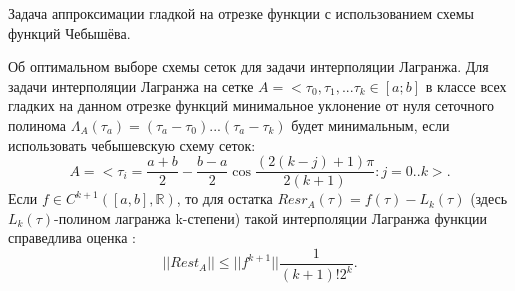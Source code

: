 \documentclass[__main__.tex]{subfiles}
\begin{document}
Задача аппроксимации гладкой на отрезке функции с использованием схемы функций Чебышёва.\\

\begin{theorem}
	Об оптимальном выборе схемы сеток для задачи интерполяции Лагранжа. Для задачи интерполяции Лагранжа на сетке $A=<\tau_{0},\tau_{1},...\tau_{k}\in[a;b]$ в классе всех гладких на данном отрезке функций минимальное уклонение от нуля сеточного полинома $\Lambda_{A}(\tau_{a})=(\tau_{a}-\tau_{0})...(\tau_{a}-\tau_{k})$ будет минимальным, если использовать чебышевскую схему сеток:
	$$A=<\tau_{i}=\frac{a+b}{2}-\frac{b-a}{2}\cos\frac{(2(k-j)+1)\pi}{2(k+1)}:j=0..k>.$$
	Если $f\in C^{k+1}([a,b],\mathbb{R})$, то для остатка $Resr_{A}(\tau)=f(\tau)-L_{k}(\tau) $  (здесь $L_{k}(\tau)$-полином лагранжа k-степени) такой интерполяции Лагранжа функции справедлива оценка :
	$$||Rest_{A}||\leq||f^{k+1}||\frac{1}{(k+1)!2^{k}}. $$
\end{theorem}
\end{document}
